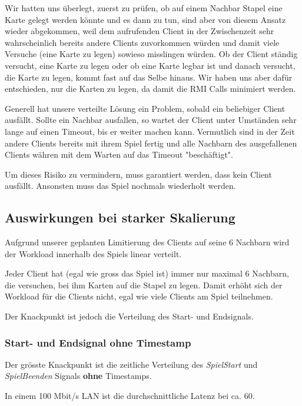Wir hatten uns überlegt, zuerst zu prüfen, ob auf einem Nachbar Stapel eine Karte gelegt werden könnte und es dann zu tun, sind aber von diesem Ansatz wieder abgekommen, weil dem aufrufenden Client in der Zwischenzeit sehr wahrscheinlich bereits andere Clients zuvorkommen würden und damit viele Versuche (eine Karte zu legen) sowieso misslingen würden. Ob der Client ständig versucht, eine Karte zu legen oder ob eine Karte legbar ist und danach versucht, die Karte zu legen, kommt fast auf das Selbe hinaus. Wir haben uns aber dafür entschieden, nur die Karten zu legen, da damit die RMI Calls minimiert werden.

Generell hat unsere verteilte Lösung ein Problem, sobald ein beliebiger Client ausfällt. Sollte ein Nachbar ausfallen, so wartet der Client unter Umständen sehr lange auf einen Timeout, bis er weiter machen kann. Vermutlich sind in der Zeit andere Clients bereits mit ihrem Spiel fertig und alle Nachbarn des ausgefallenen Clients währen mit dem Warten auf das Timeout "beschäftigt".

Um dieses Risiko zu vermindern, muss garantiert werden, dass kein Client ausfällt. Ansonsten muss das Spiel nochmals wiederholt werden.



\subsection{Auswirkungen bei starker Skalierung}

Aufgrund unserer geplanten Limitierung des Clients auf seine 6 Nachbarn wird der Workload innerhalb des Spiels linear verteilt. 

Jeder Client hat (egal wie gross das Spiel ist) immer nur maximal 6 Nachbarn, die versuchen, bei ihm Karten auf die Stapel zu legen. Damit erhöht sich der Workload für die Clients nicht, egal wie viele Clients am Spiel teilnehmen.

Der Knackpunkt ist jedoch die Verteilung des Start- und Endsignals.


\subsubsection{Start- und Endsignal ohne Timestamp}

Der grösste Knackpunkt ist die zeitliche Verteilung des \textit{SpielStart} und \textit{SpielBeenden} Signals \textbf{ohne} Timestamps.

In einem 100 Mbit/s LAN  ist die durchschnittliche Latenz bei ca. \unit{60}{\micro\second}.

